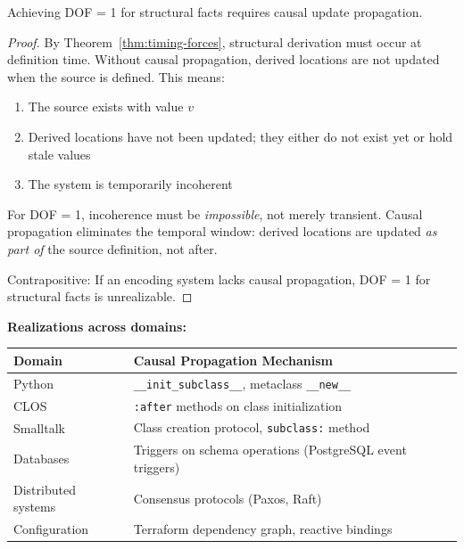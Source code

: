 \begin{theorem}[Causal Propagation is Necessary for DOF = 1]\label{thm:causal-necessary}
Achieving DOF = 1 for structural facts requires causal update propagation.
\end{theorem}

\begin{proof}
By Theorem~\ref{thm:timing-forces}, structural derivation must occur at definition time. Without causal propagation, derived locations are not updated when the source is defined. This means:
\begin{enumerate}
\tightlist
\item The source exists with value $v$
\item Derived locations have not been updated; they either do not exist yet or hold stale values
\item The system is temporarily incoherent
\end{enumerate}

For DOF = 1, incoherence must be \emph{impossible}, not merely transient. Causal propagation eliminates the temporal window: derived locations are updated \emph{as part of} the source definition, not after.

Contrapositive: If an encoding system lacks causal propagation, DOF = 1 for structural facts is unrealizable.
\end{proof}

\textbf{Realizations across domains:}

\begin{center}
\begin{tabularx}{\linewidth}{lX}
\toprule
\textbf{Domain} & \textbf{Causal Propagation Mechanism} \\
\midrule
Python & \texttt{\_\_init\_subclass\_\_}, metaclass \texttt{\_\_new\_\_} \\
CLOS & \texttt{:after} methods on class initialization \\
Smalltalk & Class creation protocol, \texttt{subclass:} method \\
Databases & Triggers on schema operations (PostgreSQL event triggers) \\
Distributed systems & Consensus protocols (Paxos, Raft) \\
Configuration & Terraform dependency graph, reactive bindings \\
\bottomrule
\end{tabularx}
\end{center}

